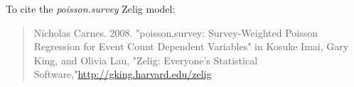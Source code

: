 To cite the \emph{ poisson.survey } Zelig model:
 \begin{verse}
 Nicholas Carnes. 2008. "poisson.survey: Survey-Weighted Poisson Regression for Event Count Dependent Variables" in Kosuke Imai, Gary King, and Olivia Lau, "Zelig: Everyone's Statistical Software,"\url{http://gking.harvard.edu/zelig} 
\end{verse}